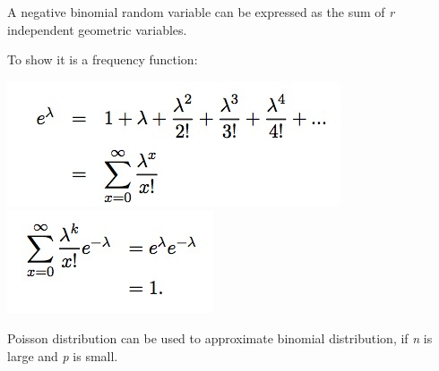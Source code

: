 \documentclass{/out/app/latex/examnotes}
\begin{document}

A negative binomial random variable can be expressed as the sum of \emph{r} independent geometric variables.

{
\vspace{6pt}

\disobeylines
{} %

\obeylines


To show it is a frequency function: 

\includegraphics[scale=0.7]{./img/2poi1.jpg}
\includegraphics[scale=0.7]{./img/2poi2.jpg}

Poisson distribution can be used to approximate binomial distribution, if \emph{n} is large and \emph{p} is small.

}
\end{document}
